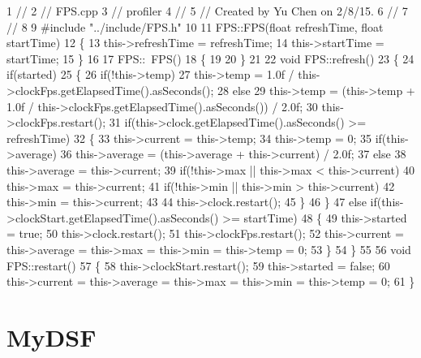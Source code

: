 \begin{DoxyCodeInclude}
1 \textcolor{comment}{//}
2 \textcolor{comment}{//  FPS.cpp}
3 \textcolor{comment}{//  profiler}
4 \textcolor{comment}{//}
5 \textcolor{comment}{//  Created by Yu Chen on 2/8/15.}
6 \textcolor{comment}{//}
7 \textcolor{comment}{//}
8 
9 \textcolor{preprocessor}{#include "../include/FPS.h"}
10 
11 FPS::FPS(\textcolor{keywordtype}{float} refreshTime, \textcolor{keywordtype}{float} startTime)
12 \{
13     this->refreshTime = refreshTime;
14     this->startTime = startTime;
15 \}
16 
17 FPS::~FPS()
18 \{
19     
20 \}
21 
22 \textcolor{keywordtype}{void} FPS::refresh()
23 \{
24     \textcolor{keywordflow}{if}(started)
25     \{
26         \textcolor{keywordflow}{if}(!this->temp)
27             this->temp = 1.0f / this->clockFps.getElapsedTime().asSeconds();
28         \textcolor{keywordflow}{else}
29             this->temp = (this->temp + 1.0f / this->clockFps.getElapsedTime().asSeconds()) / 2.0f;
30         this->clockFps.restart();
31         \textcolor{keywordflow}{if}(this->clock.getElapsedTime().asSeconds() >= refreshTime)
32         \{
33             this->current = this->temp;
34             this->temp = 0;
35             \textcolor{keywordflow}{if}(this->average)
36                 this->average = (this->average + this->current) / 2.0f;
37             \textcolor{keywordflow}{else}
38                 this->average = this->current;
39             \textcolor{keywordflow}{if}(!this->max || this->max < this->current)
40                 this->max = this->current;
41             \textcolor{keywordflow}{if}(!this->min || this->min > this->current)
42                 this->min = this->current;
43             
44             this->clock.restart();
45         \}
46     \}
47     \textcolor{keywordflow}{else} \textcolor{keywordflow}{if}(this->clockStart.getElapsedTime().asSeconds() >= startTime)
48     \{
49         this->started = \textcolor{keyword}{true};
50         this->clock.restart();
51         this->clockFps.restart();
52         this->current = this->average = this->max = this->min = this->temp = 0;
53     \}
54 \}
55 
56 \textcolor{keywordtype}{void} FPS::restart()
57 \{
58     this->clockStart.restart();
59     this->started = \textcolor{keyword}{false};
60     this->current = this->average = this->max = this->min = this->temp = 0;
61 \}
\end{DoxyCodeInclude}
 \hypertarget{_benchmark_program_BenchmarkProgramMyDSF}{}\section{My\+D\+S\+F}\label{_benchmark_program_BenchmarkProgramMyDSF}
